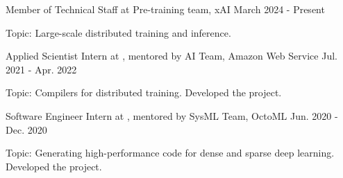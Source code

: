

\begin{cventries}

\cventry
{Member of Technical Staff at } %
{Pre-training team, xAI} %
{March 2024 - Present} %
{} %
{
	\begin{cvitems} %
		\item{Topic: Large-scale distributed training and inference.}
	\end{cvitems}
}


\cventry
{Applied Scientist Intern at , mentored by } %
{AI Team, Amazon Web Service} %
{Jul. 2021 - Apr. 2022} %
{} %
{
	\begin{cvitems} %
		\item{Topic: Compilers for distributed training. Developed the  project.}
	\end{cvitems}
}

\cventry
	{Software Engineer Intern at , mentored by } %
	{SysML Team, OctoML} %
	{Jun. 2020 - Dec. 2020} %
	{} %
	{
		\begin{cvitems} %
			\item{Topic: Generating high-performance code for dense and sparse deep learning. Developed the  project.}
		\end{cvitems}
    }

\end{cventries}
